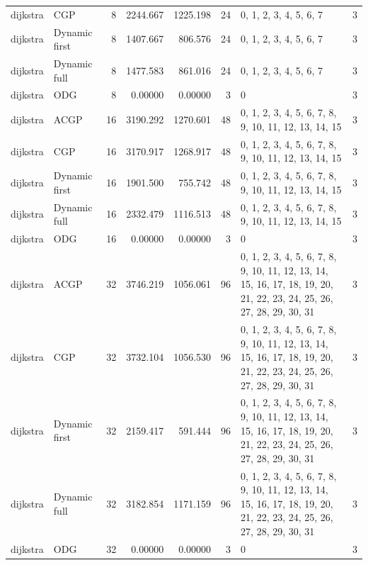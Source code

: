 \documentclass[10pt,a4paper]{article}
\begin{document}
\begin{longtable}{@{}p{23mm}p{29mm}rrrrp{36mm}r@{}}
dijkstra & CGP & 8 & 2244.667 & 1225.198 & 24 & 0, 1, 2, 3, 4, 5, 6, 7 & 3 \\
dijkstra & Dynamic first & 8 & 1407.667 & 806.576 & 24 & 0, 1, 2, 3, 4, 5, 6, 7 & 3 \\
dijkstra & Dynamic full & 8 & 1477.583 & 861.016 & 24 & 0, 1, 2, 3, 4, 5, 6, 7 & 3 \\
dijkstra & ODG & 8 & 0.00000 & 0.00000 & 3 & 0 & 3 \\
dijkstra & ACGP & 16 & 3190.292 & 1270.601 & 48 & 0, 1, 2, 3, 4, 5, 6, 7, 8, 9, 10, 11, 12, 13, 14, 15 & 3 \\
dijkstra & CGP & 16 & 3170.917 & 1268.917 & 48 & 0, 1, 2, 3, 4, 5, 6, 7, 8, 9, 10, 11, 12, 13, 14, 15 & 3 \\
dijkstra & Dynamic first & 16 & 1901.500 & 755.742 & 48 & 0, 1, 2, 3, 4, 5, 6, 7, 8, 9, 10, 11, 12, 13, 14, 15 & 3 \\
dijkstra & Dynamic full & 16 & 2332.479 & 1116.513 & 48 & 0, 1, 2, 3, 4, 5, 6, 7, 8, 9, 10, 11, 12, 13, 14, 15 & 3 \\
dijkstra & ODG & 16 & 0.00000 & 0.00000 & 3 & 0 & 3 \\
dijkstra & ACGP & 32 & 3746.219 & 1056.061 & 96 & 0, 1, 2, 3, 4, 5, 6, 7, 8, 9, 10, 11, 12, 13, 14, 15, 16, 17, 18, 19, 20, 21, 22, 23, 24, 25, 26, 27, 28, 29, 30, 31 & 3 \\
dijkstra & CGP & 32 & 3732.104 & 1056.530 & 96 & 0, 1, 2, 3, 4, 5, 6, 7, 8, 9, 10, 11, 12, 13, 14, 15, 16, 17, 18, 19, 20, 21, 22, 23, 24, 25, 26, 27, 28, 29, 30, 31 & 3 \\
dijkstra & Dynamic first & 32 & 2159.417 & 591.444 & 96 & 0, 1, 2, 3, 4, 5, 6, 7, 8, 9, 10, 11, 12, 13, 14, 15, 16, 17, 18, 19, 20, 21, 22, 23, 24, 25, 26, 27, 28, 29, 30, 31 & 3 \\
dijkstra & Dynamic full & 32 & 3182.854 & 1171.159 & 96 & 0, 1, 2, 3, 4, 5, 6, 7, 8, 9, 10, 11, 12, 13, 14, 15, 16, 17, 18, 19, 20, 21, 22, 23, 24, 25, 26, 27, 28, 29, 30, 31 & 3 \\
dijkstra & ODG & 32 & 0.00000 & 0.00000 & 3 & 0 & 3 \\
\end{longtable}\normalsize\setlength{\tabcolsep}{6pt}
\clearpage
\end{document}
